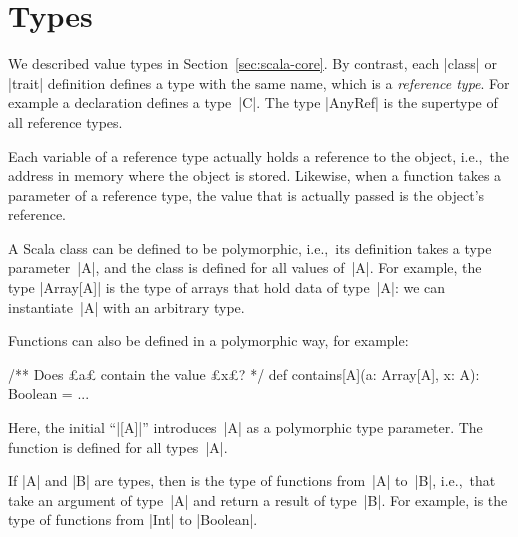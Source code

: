 \section{Types}
\label{sec:scala-types}



We described value types in Section~\ref{sec:scala-core}.  By contrast, each
|class| or |trait| definition defines a type with the same
name, which is a \emph{reference type}.  For example
a declaration 
defines a type~|C|. The type |AnyRef| is the supertype of
all reference types.

Each variable of a reference type actually holds a reference to the object,
i.e.,~the address in memory where the object is stored.
Likewise, when a function takes a parameter
of a reference type, the value that is actually passed is the object's
reference.


A Scala class can be defined to be polymorphic, i.e.,~its
definition takes a type parameter~|A|, and the class is
defined for all values of~|A|.  For example, the type |Array[A]| is the type
of arrays that hold data of type~|A|: we can instantiate~|A| with an arbitrary
type.

Functions can also be defined in a polymorphic way, for example:
\begin{scala}
  /** Does £a£ contain the value £x£? */
  def contains[A](a: Array[A], x: A): Boolean = ...
\end{scala}
%
Here, the initial ``|[A]|'' introduces~|A| as a polymorphic type parameter.
The function is defined for all types~|A|. 


If |A| and |B| are types, then  is the type
of functions from~|A| to~|B|, i.e.,~that take an argument of type~|A| and
return a result of type~|B|.  For example,  is the type
of functions from |Int| to |Boolean|.  

